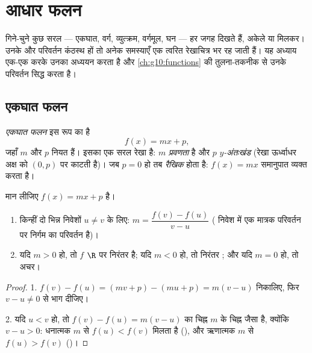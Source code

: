 \chapter{आधार फलन}\label{ch:g10:reffunc}

गिने-चुने कुछ सरल  --- एकघात, वर्ग, व्युत्क्रम, वर्गमूल, घन --- हर जगह
दिखते हैं, अकेले या मिलकर। उनके  और परिवर्तन कंठस्थ हों तो अनेक समस्याएँ
एक त्वरित रेखाचित्र भर रह जाती हैं। यह अध्याय एक-एक करके उनका अध्ययन करता है
और \cref{ch:g10:functions} की तुलना-तकनीक से उनके परिवर्तन सिद्ध करता है।

\section{एकघात फलन}

\begin{definition}\label{def:g10:reffunc:affine}
\emph{एकघात फलन} इस रूप का  है
\[
f(x) = mx + p,
\]
जहाँ $m$ और $p$ नियत  हैं। इसका  एक सरल रेखा है: $m$
\emph{प्रवणता} है और $p$ \emph{$y$-अंतःखंड}
(रेखा ऊर्ध्वाधर अक्ष को $(0, p)$ पर काटती है)। जब $p = 0$ हो तब  \emph{रैखिक}
होता है: $f(x) = mx$ समानुपात व्यक्त करता है।
\end{definition}

\begin{proposition}[प्रवणता और परिवर्तन]\label{prop:g10:reffunc:affine}
मान लीजिए $f(x) = mx + p$ है।
\begin{enumerate}
  \item किन्हीं दो भिन्न निवेशों $u \neq v$ के लिए: $m = \dfrac{f(v) - f(u)}{v - u}$ ( निवेश में एक
        मात्रक परिवर्तन पर निर्गम का परिवर्तन है)।
  \item यदि $m > 0$ हो, तो $f$ $\R$ पर निरंतर  है; यदि $m < 0$ हो, तो
        निरंतर ; और यदि $m = 0$ हो, तो अचर।
\end{enumerate}
\end{proposition}

\begin{proof}
1. $f(v) - f(u) = (mv + p) - (mu + p) = m(v - u)$ निकालिए, फिर $v - u \neq 0$ से भाग दीजिए।

2. यदि $u < v$ हो, तो $f(v) - f(u) = m(v-u)$ का चिह्न $m$ के चिह्न जैसा है, क्योंकि $v - u > 0$:
धनात्मक $m$ से $f(u) < f(v)$ मिलता है (), और ऋणात्मक $m$ से $f(u) > f(v)$ ()।
\end{proof}

